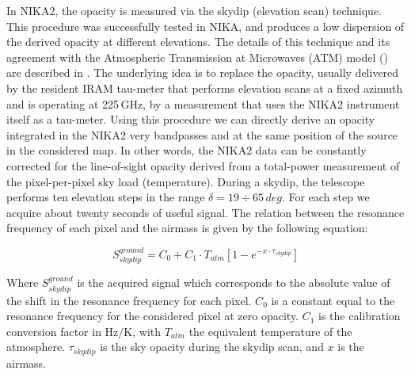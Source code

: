 \documentclass[]{aa} %
\begin{document}
In NIKA2, the opacity is measured via the skydip (elevation scan) technique. This procedure was successfully tested in NIKA, and produces a low dispersion of the derived opacity at different elevations. The details of this technique and its agreement with the Atmospheric Transmission at Microwaves (ATM) model (\cite{2001IEEE....49.1683C}) are described in \cite{Catalano2014}. The underlying idea is to replace the opacity, usually delivered by the resident IRAM tau-meter that performs elevation scans at a fixed azimuth and is operating at 225\,GHz, by a measurement that uses the NIKA2 instrument itself as a tau-meter. Using this procedure we can directly derive an opacity integrated in the NIKA2 very bandpasses and at the same position of the source in the considered map. In other words, the NIKA2 data can be constantly corrected for the line-of-sight opacity derived from a total-power measurement of the pixel-per-pixel sky load (temperature).
During a skydip, the telescope performs ten elevation steps in the range $\delta = 19\div65\,deg$. For each step we acquire about twenty seconds of useful signal. The relation between the resonance frequency of each pixel and the airmass is given by the following equation:

\begin{equation}\label{eq:skydip}
S^{ground}_{skydip} = C_0 + C_1 \cdot T_{atm}[1 - e^{- x \cdot \tau_{skydip}}]
\end{equation}

Where $S^{ground}_{skydip}$ is the acquired signal which corresponds to the
absolute value of the shift in the resonance frequency for each pixel. $C_0$ is a constant equal to the resonance frequency for the considered pixel at zero opacity. $C_1$ is the calibration conversion factor in $\mathrm{Hz/K}$, with $T_{atm}$ the equivalent temperature of the
atmosphere. $\tau_{skydip}$ is the sky opacity during the skydip scan, and $x$ is the airmass.
\end{document}
